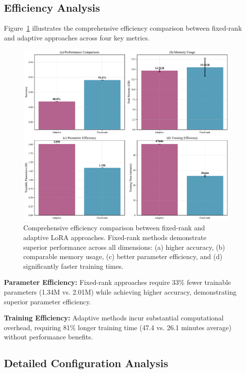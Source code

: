 \documentclass[11pt,a4paper]{article}
\begin{document}
\subsection{Efficiency Analysis}

Figure~\ref{fig:main_comparison} illustrates the comprehensive efficiency comparison between fixed-rank and adaptive approaches across four key metrics.

\begin{figure}[htbp]
    \centering
    \includegraphics[width=\textwidth]{figures/figure1_main_comparison.pdf}
    \caption{Comprehensive efficiency comparison between fixed-rank and adaptive LoRA approaches. Fixed-rank methods demonstrate superior performance across all dimensions: (a) higher accuracy, (b) comparable memory usage, (c) better parameter efficiency, and (d) significantly faster training times.}
    \label{fig:main_comparison}
\end{figure}

\textbf{Parameter Efficiency:} Fixed-rank approaches require 33\% fewer trainable parameters (1.34M vs. 2.01M) while achieving higher accuracy, demonstrating superior parameter efficiency.

\textbf{Training Efficiency:} Adaptive methods incur substantial computational overhead, requiring 81\% longer training time (47.4 vs. 26.1 minutes average) without performance benefits.

\subsection{Detailed Configuration Analysis}
\end{document}
